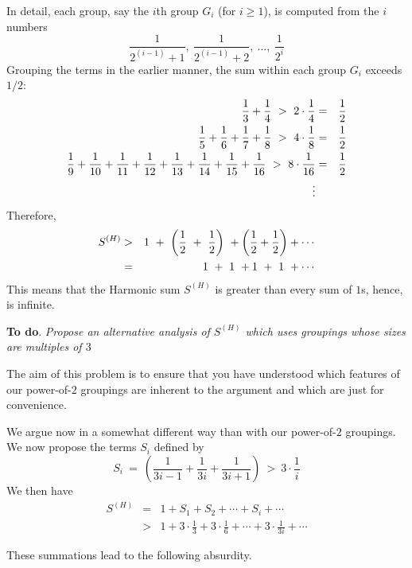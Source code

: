 \begin{itemize}
In detail, each group, say the $i$th group $G_i$ (for $i \geq 1$), is computed from the $i$ numbers
\[ \frac{1}{2^{(i-1)}+1}, \ \frac{1}{2^{(i-1)}+2}, \ \ldots, \ \frac{1}{2^{i}}  \]
Grouping the terms in the earlier manner, the sum within each group $G_i$ exceeds $1/2$:
\begin{eqnarray*}
{1 \over 3} + {1 \over 4} \ > \ 2 \cdot {1 \over 4} & = & {1 \over 2} \\ \smallskip
{1 \over 5} + {1 \over 6} + {1 \over 7}+ {1 \over 8} \ > \ 4 \cdot {1 \over 8} & = & {1 \over 2}  \\  \smallskip
{1 \over 9} + {1 \over 10} + {1 \over 11}  +{1 \over 12} + {1 \over 13} + {1 \over 14} + {1 \over 15} + {1 \over 16}  \ > \ 8 \cdot {1 \over 16} & = & {1 \over 2}  \\  \smallskip
\vdots
\end{eqnarray*}
Therefore, 
\begin{eqnarray*}
S^{(H)} & > & 1 \ + \ \left( {1 \over 2} \ + \ {1 \over 2} \right) \ + \left( {1 \over 2} + {1 \over 2} \right) + \cdots \\
             & = & 1 \ + \ 1 \ +  1 \ + \ 1 \ + \cdots
\end{eqnarray*}
This means that the Harmonic sum $S^{(H)}$ is greater than every sum of $1$s, hence, is infinite.

\medskip

{\bf To do}. {\em Propose an alternative analysis of $S^{(H)}$ which uses groupings whose sizes are multiples of $3$}

\smallskip

The aim of this problem is to ensure that you have understood which features of our power-of-$2$ groupings are inherent to the argument and which are just for convenience.

\smallskip

We argue now in a somewhat different way than with our power-of-$2$ groupings.  We now propose the terms $S_i$ defined by
\[ 
S_i \ = \ \left( \frac{1}{3i-1} + \frac{1}{3i} + \frac{1}{3i+1} \right) \ >  \ 3 \cdot \frac{1}{i}
 \]
We then have
\begin{eqnarray}
\nonumber
S^{(H)}  & = & 1 + S_1 +  S_2 + \cdots + S_i + \cdots  \\
\label{eq:harmonic-by-3}
             & >  & 1 + 3 \cdot \frac{1}{3} + 3 \cdot \frac{1}{6} + \cdots + 3 \cdot \frac{1}{3i} + \cdots
\end{eqnarray}

These summations lead to the following absurdity.


\end{itemize}
